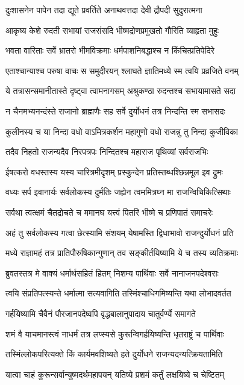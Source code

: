 \twolineshloka
{दुःशासनेन पापेन तदा द्यूते प्रवर्तिते}
{अनाथवत्तदा देवी द्रौपदी सुदुरात्मना}


\twolineshloka
{आकृष्य केशे रुदती सभायां राजसंसदि}
{भीष्मद्रोणप्रमुखतो गौरिति व्याहृता मुहुः}


\twolineshloka
{भवता वारिताः सर्वे भ्रातरो भीमविक्रमाः}
{धर्मपाशनिबद्धाश्च न किंचित्प्रतिपेदिरे}


\twolineshloka
{एताश्चान्याश्च परुषा वाचः स समुदीरयन्}
{श्लाघते ज्ञातिमध्ये स्म त्वयि प्रव्रजिते वनम्}


\twolineshloka
{ये तत्रासन्समानीतास्ते दृष्ट्वा त्वामनागसम्}
{अश्रुकण्ठा रुदन्तश्च सभायामासते सदा}


\twolineshloka
{न चैनमभ्यनन्दंस्ते राजानो ब्राह्मणैः सह}
{सर्वे दुर्योधनं तत्र निन्दन्ति स्म सभासदः}


\twolineshloka
{कुलीनस्य च या निन्दा वधो वाऽमित्रकर्शन}
{महागुणो वधो राजन्नु तु निन्दा कुजीविका}


\twolineshloka
{तदैव निहतो राजन्यदैव निरपत्रपः}
{निन्दितश्च महाराज पृथिव्यां सर्वराजभिः}


\twolineshloka
{ईषत्करो वधस्तस्य यस्य चारित्रमीदृशम्}
{प्रस्कुन्देन प्रतिस्तब्धश्छिन्नमूल इव द्रुमः}


\twolineshloka
{वध्यः सर्प इवानार्यः सर्वलोकस्य दुर्मतिः}
{जह्येन त्वममित्रघ्न मा राजन्विचिकित्सिथाः}


\twolineshloka
{सर्वथा त्वत्क्षमं चैतद्रोचते च ममानघ}
{यत्त्वं पितरि भीष्मे च प्रणिपातं समाचरेः}


\twolineshloka
{अहं तु सर्वलोकस्य गत्वा छेत्स्यामि संशयम्}
{येषामस्ति द्विधाभावो राजन्दुर्योधनं प्रति}


\twolineshloka
{मध्ये राज्ञामहं तत्र प्रातिपौरुषिकान्गुणान्}
{तव सङ्कीर्तयिष्यामि ये च तस्य व्यतिक्रमाः}


\twolineshloka
{ब्रुवतस्तत्र मे वाक्यं धर्मार्थसहितं हितम्}
{निशम्य पार्थिवाः सर्वे नानाजनपदेश्वराः}


\twolineshloka
{त्वयि संप्रतिपत्स्यन्ते धर्मात्मा सत्यवागिति}
{तस्मिंश्चाधिगमिष्यन्ति यथा लोभादवर्तत}


\twolineshloka
{गर्हयिष्यामि चैवैनं पौरजानपदेष्वपि}
{वृद्धबालानुपादाय चातुर्वर्ण्ये समागते}


\twolineshloka
{शमं वै याचमानस्त्वं नाधर्मं तत्र लप्स्यसे}
{कुरून्विगर्हयिष्यन्ति धृतराष्ट्रं च पार्थिवाः}


\twolineshloka
{तस्मिंल्लोकपरित्यक्ते किं कार्यमवशिष्यते}
{हते दुर्योधने राजन्यदन्यत्क्रियतामिति}


\twolineshloka
{यात्वा चाहं कुरून्सर्वान्युष्मदर्थमहापयन्}
{यतिष्ये प्रशमं कर्तुं लक्षयिष्ये च चेष्टितम्}


